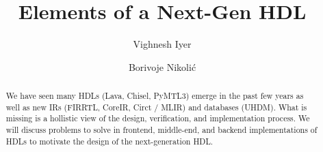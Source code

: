 \documentclass[sigplan,review,nonacm,9pt]{acmart}
\begin{document}
\title{Elements of a Next-Gen HDL}


\author{Vighnesh Iyer}

\author{Borivoje Nikolić}




\begin{abstract}
We have seen many HDLs (Lava, Chisel, PyMTL3) emerge in the past few years as well as new IRs (FIRRTL, CoreIR, Circt / MLIR) and databases (UHDM).
What is missing is a hollistic view of the design, verification, and implementation process.
We will discuss problems to solve in frontend, middle-end, and backend implementations of HDLs to motivate the design of the next-generation HDL.
\end{abstract}


\maketitle
\end{document}
